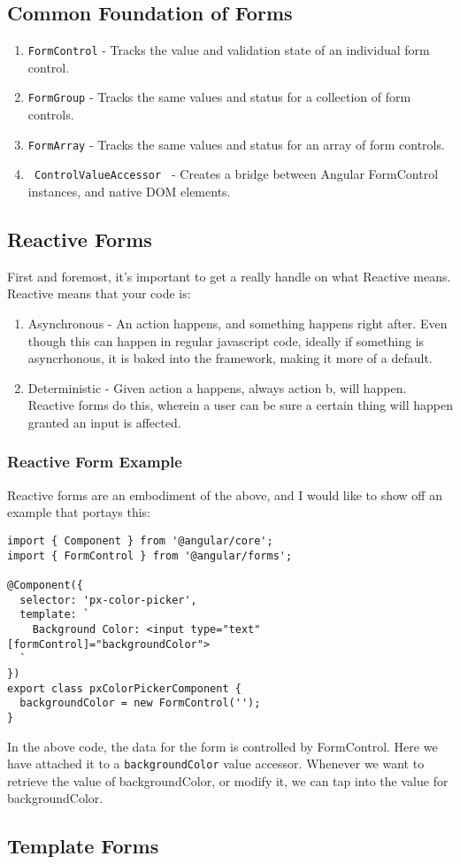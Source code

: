 \subsection{ Common Foundation of Forms }
\begin{enumerate}
  \item \lstinline{FormControl} - Tracks the value and validation state of an 
  individual form control.
  \item \lstinline{FormGroup} - Tracks the same values and status for a 
  collection of form controls.
  \item \lstinline{FormArray} - Tracks the same values and status for an array
  of form controls. 
  \item \lstinline{ ControlValueAccessor } - Creates a bridge between Angular
  FormControl instances, and native DOM elements.
\end{enumerate}

\subsection{ Reactive Forms }
First and foremost, it's important to get a really handle on what Reactive 
means. Reactive means that your code is:
\begin{enumerate}
  \item Asynchronous - An action happens, and something happens right after. 
  Even though this can happen in regular javascript code, ideally if 
  something is asyncrhonous, it is baked into the framework, making it 
  more of a default.
  \item Deterministic -  Given action a happens, always action b, will 
  happen. Reactive forms do this, wherein a user can be sure a certain 
  thing will happen granted an input is affected.
\end{enumerate}

\subsubsection{ Reactive Form Example }
Reactive forms are an embodiment of the above, and I would like to show off an
example that portays this: 

\begin{lstlisting}
import { Component } from '@angular/core';
import { FormControl } from '@angular/forms';
  
@Component({
  selector: 'px-color-picker',
  template: `
    Background Color: <input type="text" [formControl]="backgroundColor">
  `
})
export class pxColorPickerComponent {
  backgroundColor = new FormControl('');
}
\end{lstlisting}

In the above code, the data for the form is controlled by FormControl. Here we
have attached it to a \lstinline{backgroundColor} value accessor. Whenever we 
want to retrieve the value of backgroundColor, or modify it, we can tap into 
the value for backgroundColor. 

\subsection{Template Forms}




